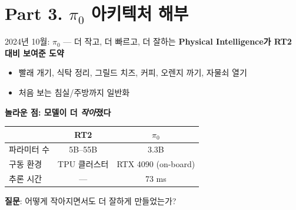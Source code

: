 \documentclass[aspectratio=169,10pt]{beamer}
\begin{document}
\section{Part 3. $\pi_0$ 아키텍처 해부}

\begin{frame}{2024년 10월: $\pi_0$ --- 더 작고, 더 빠르고, 더 잘하는}
\textbf{Physical Intelligence가 RT2 대비 보여준 도약}
\begin{itemize}
  \item 빨래 개기, 식탁 정리, 그릴드 치즈, 커피, 오렌지 까기, 자물쇠 열기
  \item 처음 보는 침실/주방까지 일반화
\end{itemize}

\vspace{0.8em}
\textbf{놀라운 점: 모델이 더 \textit{작아}졌다}
\begin{center}
\begin{tabular}{lcc}
\toprule
 & RT2 & $\pi_0$ \\
\midrule
파라미터 수 & 5B--55B & \alert{3.3B} \\
구동 환경 & TPU 클러스터 & \alert{RTX 4090 (on-board)} \\
추론 시간 & --- & \alert{73 ms} \\
\bottomrule
\end{tabular}
\end{center}

\vspace{0.8em}
\textbf{질문}: 어떻게 작아지면서도 더 잘하게 만들었는가?
\end{frame}
\end{document}
